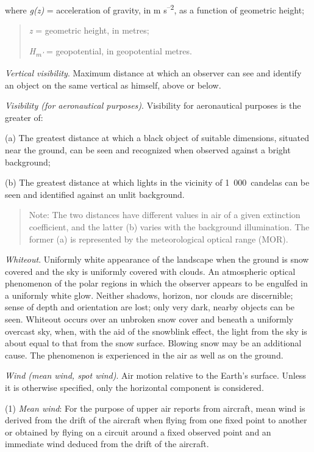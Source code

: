 where \emph{g(z)} = acceleration of gravity, in m s\textsuperscript{--2}, as a function of geometric height;

\begin{quote}
\emph{z} = geometric height, in metres;

\emph{H\textsubscript{m'}} = geopotential, in geopotential metres.
\end{quote}

\emph{Vertical visibility}. Maximum distance at which an observer can see and identify an object on the same vertical as himself, above or below.

\emph{Visibility (for aeronautical purposes)}. Visibility for aeronautical purposes is the greater of:

(a) The greatest distance at which a black object of suitable dimensions, situated near the ground, can be seen and recognized when observed against a bright background;

(b) The greatest distance at which lights in the vicinity of 1~000~candelas can be seen and identified against an unlit background.

\begin{quote}
Note: The two distances have different values in air of a given extinction coefficient, and the latter (b) varies with the background illumination. The former (a) is represented by the meteorological optical range (MOR).
\end{quote}

\emph{Whiteout}. Uniformly white appearance of the landscape when the ground is snow covered and the sky is uniformly covered with clouds. An atmospheric optical phenomenon of the polar regions in which the observer appears to be engulfed in a uniformly white glow. Neither shadows, horizon, nor clouds are discernible; sense of depth and orientation are lost; only very dark, nearby objects can be seen. Whiteout occurs over an unbroken snow cover and beneath a uniformly overcast sky, when, with the aid of the snowblink effect, the light from the sky is about equal to that from the snow surface. Blowing snow may be an additional cause. The phenomenon is experienced in the air as well as on the ground.

\emph{Wind (mean wind, spot wind)}. Air motion relative to the Earth's surface. Unless it is otherwise specified, only the horizontal component is considered.

(1) \emph{Mean wind}: For the purpose of upper air reports from aircraft, mean wind is derived from the drift of the aircraft when flying from one fixed point to another or obtained by flying on a circuit around a fixed observed point and an immediate wind deduced from the drift of the aircraft.

